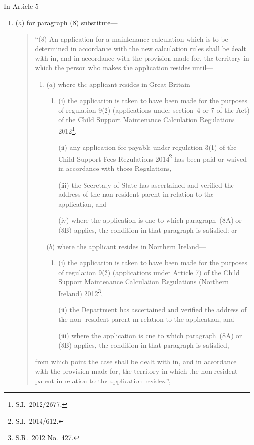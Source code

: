 \documentclass[12pt,a4paper]{article}
\begin{document}
In Article 5---
\begin{enumerate}\item[]
($a$) for paragraph (8) substitute---
\begin{quotation}
``(8) An application for a maintenance calculation which is to be determined in
accordance with the new calculation rules shall be dealt with in, and in accordance
with the provision made for, the territory in which the person who makes the
application resides until---
\begin{enumerate}\item[]
($a$) where the applicant resides in Great Britain---
\begin{enumerate}\item[]
(i) the application is taken to have been made for the purposes of
regulation 9(2) (applications under section~4 or 7 of the Act) of the
Child Support Maintenance Calculation Regulations 2012\footnote{S.I.~2012/2677.},

(ii) any application fee payable under regulation 3(1) of the Child Support Fees Regulations 2014\footnote{S.I.~2014/612.} has been paid or waived in accordance with those Regulations,

(iii) the Secretary of State has ascertained and verified the address of the
non-resident parent in relation to the application, and

(iv) where the application is one to which paragraph~(8A) or (8B) applies,
the condition in that paragraph is satisfied; or
\end{enumerate}

($b$) where the applicant resides in Northern Ireland---
\begin{enumerate}\item[]
(i) the application is taken to have been made for the purposes of
regulation 9(2) (applications under Article 7) of the Child Support
Maintenance Calculation Regulations (Northern Ireland) 2012\footnote{S.R.~2012 No.~427.},

(ii) the Department has ascertained and verified the address of the non-%
resident parent in relation to the application, and

(iii) where the application is one to which paragraph~(8A) or (8B) applies,
the condition in that paragraph is satisfied,
\end{enumerate}
\end{enumerate}
from which point the case shall be dealt with in, and in accordance with the
provision made for, the territory in which the non-resident parent in relation to the 
application resides.'';
\end{quotation}


\end{enumerate}
\end{document}
